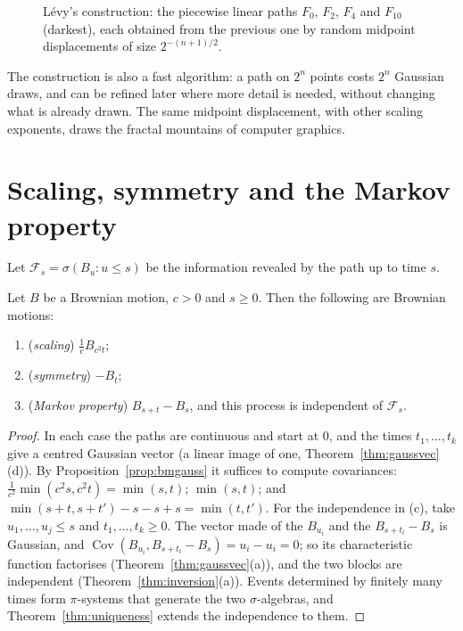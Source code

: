 \begin{figure}[ht]
\centering
{}
\caption{L\'evy's construction: the piecewise linear paths $F_0$, $F_2$, $F_4$ and $F_{10}$ (darkest), each obtained from the previous one by random
midpoint displacements of size $2^{-(n+1)/2}$.}
\label{fig:levy}
\end{figure}

\begin{beauty}
The construction is also a fast algorithm: a path on $2^n$ points costs $2^n$ Gaussian draws, and can be refined later
where more detail is needed, without changing what is already drawn. The same midpoint displacement, with other
scaling exponents, draws the fractal mountains of computer graphics.
\end{beauty}

\section{Scaling, symmetry and the Markov property}

Let $\mathcal F_s=\sigma(B_u:u\le s)$ be the information revealed by the path up to time $s$.

\begin{proposition}\label{prop:scaling}
Let $B$ be a Brownian motion, $c>0$ and $s\ge0$. Then the following are Brownian motions:
\begin{enumerate}[label=(\alph*)]
\item (\emph{scaling}) $\frac1cB_{c^2t}$;
\item (\emph{symmetry}) $-B_t$;
\item (\emph{Markov property}) $B_{s+t}-B_s$, and this process is independent of $\mathcal F_s$.
\end{enumerate}
\end{proposition}
\begin{proof}
In each case the paths are continuous and start at $0$, and the times $t_1,\dots,t_k$ give a centred Gaussian vector (a linear image of
one, Theorem~\ref{thm:gaussvec}(d)). By Proposition~\ref{prop:bmgauss} it suffices to compute covariances: $\frac1{c^2}\min(c^2s,c^2t)=\min(s,t)$; $\min(s,t)$;
and $\min(s+t,s+t')-s-s+s=\min(t,t')$. For the independence in (c), take $u_1,\dots,u_j\le s$ and $t_1,\dots,t_k\ge0$. The vector made of the $B_{u_i}$ and the
$B_{s+t_l}-B_s$ is Gaussian, and $\operatorname{Cov}(B_{u_i},B_{s+t_l}-B_s)=u_i-u_i=0$; so its characteristic function factorises (Theorem~\ref{thm:gaussvec}(a)), and the two
blocks are independent (Theorem~\ref{thm:inversion}(a)). Events determined by finitely many times form $\pi$-systems that generate the two
$\sigma$-algebras, and Theorem~\ref{thm:uniqueness} extends the independence to them.
\end{proof}

